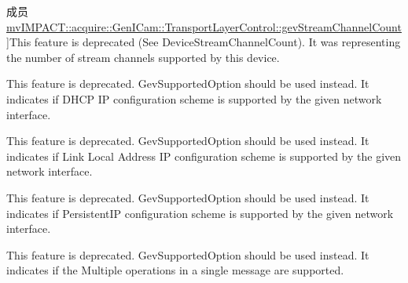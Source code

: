 \begin{DoxyRefList}
\hypertarget{deprecated__deprecated000069}{}%
成员 \hyperlink{classmv_i_m_p_a_c_t_1_1acquire_1_1_gen_i_cam_1_1_transport_layer_control_aa79a69d74d942c7937ec0b45a8ac95ce}{mv\+I\+M\+P\+A\+C\+T\+:\+:acquire\+:\+:Gen\+I\+Cam\+:\+:Transport\+Layer\+Control\+:\+:gev\+Stream\+Channel\+Count} ]This feature is deprecated (See Device\+Stream\+Channel\+Count). It was representing the number of stream channels supported by this device.  
\item[\label{deprecated__deprecated000064}%
\hypertarget{deprecated__deprecated000064}{}%
成员 \hyperlink{classmv_i_m_p_a_c_t_1_1acquire_1_1_gen_i_cam_1_1_transport_layer_control_a600a9dd1838db2516178dc639475100c}{mv\+I\+M\+P\+A\+C\+T\+:\+:acquire\+:\+:Gen\+I\+Cam\+:\+:Transport\+Layer\+Control\+:\+:gev\+Supported\+I\+P\+Configuration\+D\+H\+C\+P} ]This feature is deprecated. Gev\+Supported\+Option should be used instead. It indicates if D\+H\+C\+P I\+P configuration scheme is supported by the given network interface.  
\item[\label{deprecated__deprecated000063}%
\hypertarget{deprecated__deprecated000063}{}%
成员 \hyperlink{classmv_i_m_p_a_c_t_1_1acquire_1_1_gen_i_cam_1_1_transport_layer_control_af7c04818203a537b79bf3e4cdcc6b7ce}{mv\+I\+M\+P\+A\+C\+T\+:\+:acquire\+:\+:Gen\+I\+Cam\+:\+:Transport\+Layer\+Control\+:\+:gev\+Supported\+I\+P\+Configuration\+L\+L\+A} ]This feature is deprecated. Gev\+Supported\+Option should be used instead. It indicates if Link Local Address I\+P configuration scheme is supported by the given network interface.  
\item[\label{deprecated__deprecated000065}%
\hypertarget{deprecated__deprecated000065}{}%
成员 \hyperlink{classmv_i_m_p_a_c_t_1_1acquire_1_1_gen_i_cam_1_1_transport_layer_control_a0f269aa176f62981597215cdceaeb7d1}{mv\+I\+M\+P\+A\+C\+T\+:\+:acquire\+:\+:Gen\+I\+Cam\+:\+:Transport\+Layer\+Control\+:\+:gev\+Supported\+I\+P\+Configuration\+Persistent\+I\+P} ]This feature is deprecated. Gev\+Supported\+Option should be used instead. It indicates if Persistent\+I\+P configuration scheme is supported by the given network interface.  
\item[\label{deprecated__deprecated000076}%
\hypertarget{deprecated__deprecated000076}{}%
成员 \hyperlink{classmv_i_m_p_a_c_t_1_1acquire_1_1_gen_i_cam_1_1_transport_layer_control_ac6db9549161cbc471f29b47115bb0126}{mv\+I\+M\+P\+A\+C\+T\+:\+:acquire\+:\+:Gen\+I\+Cam\+:\+:Transport\+Layer\+Control\+:\+:gev\+Supported\+Optional\+Commands\+Concatenation} ]This feature is deprecated. Gev\+Supported\+Option should be used instead. It indicates if the Multiple operations in a single message are supported.  

\end{DoxyRefList}

